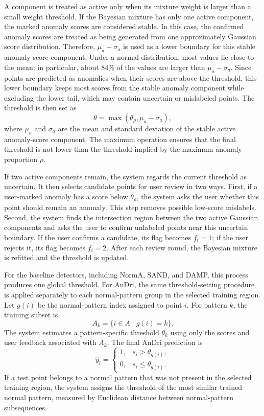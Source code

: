 A component is treated as active only when its mixture weight is larger than a small weight threshold. If the Bayesian mixture has only one active component, the marked anomaly scores are considered stable. In this case, the confirmed anomaly scores are treated as being generated from one approximately Gaussian score distribution. Therefore, \(\mu_a-\sigma_a\) is used as a lower boundary for this stable anomaly-score component. Under a normal distribution, most values lie close to the mean; in particular, about \(84\%\) of the values are larger than \(\mu_a-\sigma_a\). Since points are predicted as anomalies when their scores are above the threshold, this lower boundary keeps most scores from the stable anomaly component while excluding the lower tail, which may contain uncertain or mislabeled points. The threshold is then set as
\[\theta=\max(\theta_{\rho},\mu_a-\sigma_a),\]
where \(\mu_a\) and \(\sigma_a\) are the mean and standard deviation of the stable active anomaly-score component. The maximum operation ensures that the final threshold is not lower than the threshold implied by the maximum anomaly proportion \(\rho\).

If two active components remain, the system regards the current threshold as uncertain. It then selects candidate points for user review in two ways. First, if a user-marked anomaly has a score below \(\theta_{\rho}\), the system asks the user whether this point should remain an anomaly. This step removes possible low-score mislabels. Second, the system finds the intersection region between the two active Gaussian components and asks the user to confirm unlabeled points near this uncertain boundary. If the user confirms a candidate, its flag becomes \(f_i=1\); if the user rejects it, its flag becomes \(f_i=2\). After each review round, the Bayesian mixture is refitted and the threshold is updated.

For the baseline detectors, including NormA, SAND, and DAMP, this process produces one global threshold. For AnDri, the same threshold-setting procedure is applied separately to each normal-pattern group in the selected training region. Let \(g(i)\) be the normal-pattern index assigned to point \(i\). For pattern \(k\), the training subset is
\[ A_k=\{i\in A\mid g(i)=k\}. \]
The system estimates a pattern-specific threshold \(\theta_k\) using only the scores and user feedback associated with \(A_k\). The final AnDri prediction is
\[
\hat{y}_i =
\begin{cases}
1, & s_i>\theta_{g(i)},\\
0, & s_i\leq \theta_{g(i)}.
\end{cases}
\]
If a test point belongs to a normal pattern that was not present in the selected training region, the system assigns the threshold of the most similar trained normal pattern, measured by Euclidean distance between normal-pattern subsequences.



